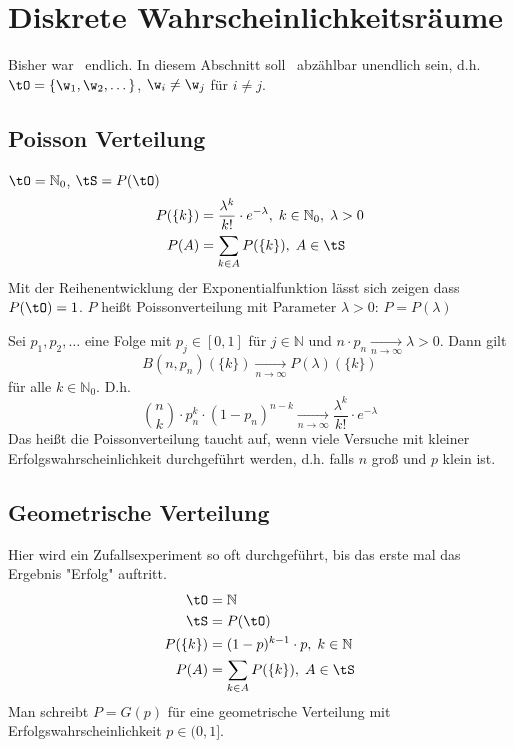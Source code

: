 \section{Diskrete Wahrscheinlichkeitsräume}
Bisher war \tO\ endlich. In diesem Abschnitt soll \tO\ abzählbar unendlich sein, d.h.
$\tO = \{ \w_1, \w_2, \dots\}$, $\w_i \neq \w_j$ für $i \neq j$.

\subsection{Poisson Verteilung}
$\tO = \mathbb{N}_0$, $\tS = P(\tO)$
\begin{align*}
    P(\{k\}) & = \frac{\lambda^k}{k!} \cdot e^{-\lambda}, \; k \in \mathbb{N}_0, \; \lambda > 0 \\
    P(A)     & = \sum_{k \in A} P(\{k\}), \; A \in \tS
\end{align*}
Mit der Reihenentwicklung der Exponentialfunktion lässt sich zeigen dass $P(\tO) = 1$.
$P$ heißt Poissonverteilung mit Parameter $\lambda > 0$: $P = P(\lambda)$

\begin{theorem}
    Sei $p_1, p_2, \dots$ eine Folge mit $p_j \in [0, 1]$ für $j \in \mathbb{N}$ und
    $n \cdot p_n \xrightarrow[n \to \infty]{} \lambda > 0$.
    Dann gilt
    \begin{equation*}
        B(n, p_n)(\{k\}) \xrightarrow[n \to \infty]{} P(\lambda)(\{k\})
    \end{equation*}
    für alle $k \in \mathbb{N}_0$. D.h.
    \begin{equation*}
        \binom{n}{k} \cdot p_n^k \cdot (1-p_n)^{n-k} \xrightarrow[n \to \infty]{} \frac{\lambda^k}{k!} \cdot e^{-\lambda}
    \end{equation*}
    Das heißt die Poissonverteilung taucht auf, wenn viele Versuche mit kleiner Erfolgswahrscheinlichkeit
    durchgeführt werden, d.h. falls $n$ groß und $p$ klein ist.
\end{theorem}

\subsection{Geometrische Verteilung}
Hier wird ein Zufallsexperiment so oft durchgeführt, bis das erste mal das Ergebnis "Erfolg" auftritt.
\begin{align*}
    \tO      & = \mathbb{N}                               \\
    \tS      & = P(\tO)                                   \\
    P(\{k\}) & = (1-p)^{k-1} \cdot p, \; k \in \mathbb{N} \\
    P(A)     & = \sum_{k \in A} P(\{k\}), \; A \in \tS
\end{align*}
Man schreibt $P = G(p)$ für eine geometrische Verteilung mit Erfolgswahrscheinlichkeit $p \in (0,1]$.
